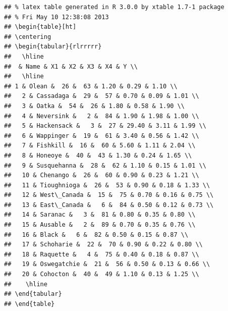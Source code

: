 \documentclass{article}\usepackage{graphicx, color}
\makeatletter
\newenvironment{kframe}{%
 \def\at@end@of@kframe{}%
 \ifinner\ifhmode%
  \def\at@end@of@kframe{\end{minipage}}%
  \begin{minipage}{\columnwidth}%
 \fi\fi%
 \def\FrameCommand##1{\hskip\@totalleftmargin \hskip-\fboxsep
 \colorbox{shadecolor}{##1}\hskip-\fboxsep
     \hskip-\linewidth \hskip-\@totalleftmargin \hskip\columnwidth}%
 \MakeFramed {\advance\hsize-\width
   \@totalleftmargin\z@ \linewidth\hsize
   \@setminipage}}%
 {\par\unskip\endMakeFramed%
 \at@end@of@kframe}
\newenvironment{knitrout}{}{} %
\numberwithin{equation}{section}
\makeatother
\begin{document}
\begin{flushleft}
\begin{enumerate}[1. ]
\begin{center}
\begin{knitrout}
\color{fgcolor}\begin{kframe}
\begin{verbatim}
## % latex table generated in R 3.0.0 by xtable 1.7-1 package
## % Fri May 10 12:38:08 2013
## \begin{table}[ht]
## \centering
## \begin{tabular}{rlrrrrr}
##   \hline
##  & Name & X1 & X2 & X3 & X4 & Y \\ 
##   \hline
## 1 & Olean &  26 &  63 & 1.20 & 0.29 & 1.10 \\ 
##   2 & Cassadaga &  29 &  57 & 0.70 & 0.09 & 1.01 \\ 
##   3 & Oatka &  54 &  26 & 1.80 & 0.58 & 1.90 \\ 
##   4 & Neversink &   2 &  84 & 1.90 & 1.98 & 1.00 \\ 
##   5 & Hackensack &   3 &  27 & 29.40 & 3.11 & 1.99 \\ 
##   6 & Wappinger &  19 &  61 & 3.40 & 0.56 & 1.42 \\ 
##   7 & Fishkill &  16 &  60 & 5.60 & 1.11 & 2.04 \\ 
##   8 & Honeoye &  40 &  43 & 1.30 & 0.24 & 1.65 \\ 
##   9 & Susquehanna &  28 &  62 & 1.10 & 0.15 & 1.01 \\ 
##   10 & Chenango &  26 &  60 & 0.90 & 0.23 & 1.21 \\ 
##   11 & Tioughnioga &  26 &  53 & 0.90 & 0.18 & 1.33 \\ 
##   12 & West\_Canada &  15 &  75 & 0.70 & 0.16 & 0.75 \\ 
##   13 & East\_Canada &   6 &  84 & 0.50 & 0.12 & 0.73 \\ 
##   14 & Saranac &   3 &  81 & 0.80 & 0.35 & 0.80 \\ 
##   15 & Ausable &   2 &  89 & 0.70 & 0.35 & 0.76 \\ 
##   16 & Black &   6 &  82 & 0.50 & 0.15 & 0.87 \\ 
##   17 & Schoharie &  22 &  70 & 0.90 & 0.22 & 0.80 \\ 
##   18 & Raquette &   4 &  75 & 0.40 & 0.18 & 0.87 \\ 
##   19 & Oswegatchie &  21 &  56 & 0.50 & 0.13 & 0.66 \\ 
##   20 & Cohocton &  40 &  49 & 1.10 & 0.13 & 1.25 \\ 
##    \hline
## \end{tabular}
## \end{table}
\end{verbatim}
\end{kframe}
\end{knitrout}


\end{center}
\end{enumerate}
\end{flushleft}
\end{document}
